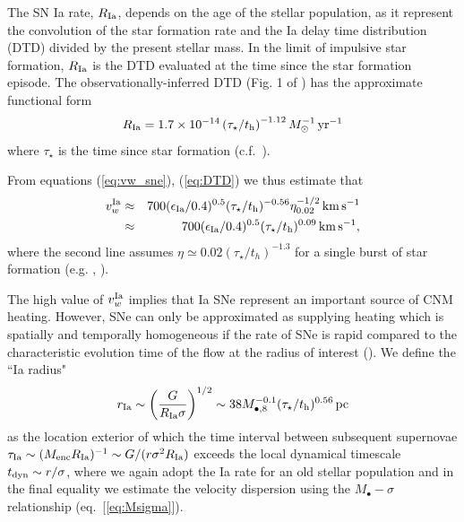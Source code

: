 \documentclass[usenatbib,fleqn]{mn2e}
\newcommand{\RateIa}{R_{\rm Ia}}
\begin{document}
The SN Ia rate, $\RateIa$, depends on the age of the stellar population, as it represent the convolution of the star formation rate and the Ia delay time distribution (DTD) divided by the present stellar mass.  In
the limit of impulsive star formation, $\RateIa$ is the DTD evaluated at the time since the star formation episode.  The observationally-inferred DTD (Fig. 1 of \citealt{MaozMannucci+:2012a}) has the
approximate functional form \begin{align}
  R_{\rm Ia} =1.7\times 10^{-14}\left(\tau_{\star}/t_{\rm
      h}\right)^{-1.12} M_{\odot}^{-1}\,{\rm yr^{-1}}
\label{eq:DTD}
  \end{align}
  where $\tau_{\star}$ is the time since star formation
  (c.f.~\citealt{Scannapieco&Bildsten05}). 

From equations (\ref{eq:vw_sne}), (\ref{eq:DTD}) we thus estimate that 
  \begin{eqnarray} 
    v_{w}^{\rm Ia} &\approx& 700(\epsilon_{\rm
      Ia}/0.4)^{0.5}(\tau_{\star}/t_{\rm h})^{-0.56}\eta_{0.02}^{-1/2}\,{\rm km
      \,s^{-1}} \nonumber \\
&\approx& 700(\epsilon_{\rm
      Ia}/0.4)^{0.5}(\tau_{\star}/t_{\rm h})^{0.09}\,{\rm km
      \,s^{-1}},
\label{eq:vIa}
  \end{eqnarray}
where the second line assumes $\eta\simeq 0.02 (\tau_{\star}/t_h)^{-1.3}$ for a single burst of star formation (e.g. , \citealt{Ciotti+91}).

The high value of $v_{w}^{\rm Ia}$ implies that Ia SNe represent an
important source of CNM heating.  However, SNe can only be
approximated as supplying heating which is spatially and temporally
homogeneous if the rate of SNe is rapid compared to the characteristic
evolution time of the flow at the radius of interest
(\citealt{ShcherbakovWong+:2014a}).  We define the ``Ia radius"
  \begin{align}
    r_{\rm Ia} \sim \left(\frac{G}{R_{\rm Ia}\sigma}\right)^{1/2} \sim
    38 M_{\bullet,8}^{-0.1}(\tau_{\star}/t_{\rm h})^{0.56}\,{\rm pc}
    \label{eq:rIa}
  \end{align}
  as the location exterior of which the time interval between
  subsequent supernovae $\tau_{\rm Ia} \sim (M_{\rm enc}R_{\rm
    Ia})^{-1} \sim G/(r\sigma^{2}R_{\rm Ia})$ exceeds the local
  dynamical timescale $t_{\rm dyn} \sim r/\sigma$, where we again
  adopt the Ia rate for an old stellar population and in the final
  equality we estimate the velocity dispersion using the
  $M_{\bullet}-\sigma$ relationship (eq.~[\ref{eq:Msigma}]).
\end{document}
